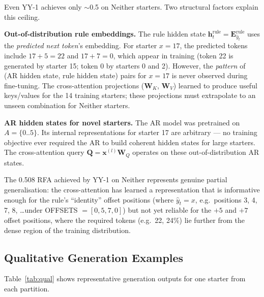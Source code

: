 \documentclass[10pt,twocolumn]{article}
\begin{document}
Even YY-1 achieves only $\sim$0.5 on Neither starters. Two structural factors explain this ceiling.

\textbf{Out-of-distribution rule embeddings.} The rule hidden state $\mathbf{h}^{\text{rule}}_t = \mathbf{E}^{\text{rule}}_{\hat{y}_t}$ uses the \emph{predicted next token}'s embedding. For starter $x=17$, the predicted tokens include $17+5=22$ and $17+7=0$, which appear in training (token 22 is generated by starter 15; token 0 by starters 0 and 2). However, the \emph{pattern} of (AR hidden state, rule hidden state) pairs for $x=17$ is never observed during fine-tuning. The cross-attention projections ($\mathbf{W}_K$, $\mathbf{W}_V$) learned to produce useful keys/values for the 14 training starters; these projections must extrapolate to an unseen combination for Neither starters.

\textbf{AR hidden states for novel starters.} The AR model was pretrained on $A = \{0..5\}$. Its internal representations for starter 17 are arbitrary --- no training objective ever required the AR to build coherent hidden states for large starters. The cross-attention query $\mathbf{Q} = \mathbf{x}^{(l)}\mathbf{W}_Q$ operates on these out-of-distribution AR states.

The 0.508 RFA achieved by YY-1 on Neither represents genuine partial generalisation: the cross-attention has learned a representation that is informative enough for the rule's ``identity'' offset positions (where $\hat{y}_t = x$, e.g.\ positions 3, 4, 7, 8, \ldots under OFFSETS $= [0,5,7,0]$) but not yet reliable for the $+5$ and $+7$ offset positions, where the required tokens (e.g.\ 22, 24\%) lie further from the dense region of the training distribution.

\subsection{Qualitative Generation Examples}

Table~\ref{tab:qual} shows representative generation outputs for one starter from each partition.
\end{document}
